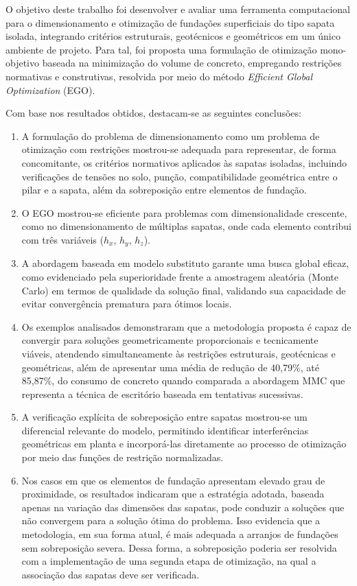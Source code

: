 O objetivo deste trabalho foi desenvolver e avaliar uma ferramenta computacional para o dimensionamento e otimização de fundações superficiais do tipo sapata isolada, integrando critérios estruturais, geotécnicos e geométricos em um único ambiente de projeto. Para tal, foi proposta uma formulação de otimização mono-objetivo baseada na minimização do volume de concreto, empregando restrições normativas e construtivas, resolvida por meio do método \textit{Efficient Global Optimization} (EGO).

Com base nos resultados obtidos, destacam-se as seguintes conclusões:
\begin{enumerate}
    \item A formulação do problema de dimensionamento como um problema de otimização com restrições mostrou-se adequada para representar, de forma concomitante, os  critérios normativos aplicados às sapatas isoladas, incluindo verificações de tensões no solo, punção, compatibilidade geométrica entre o pilar e a sapata, além da sobreposição entre elementos de fundação.
    \item O EGO mostrou-se eficiente para problemas com dimensionalidade crescente, como no dimensionamento de múltiplas sapatas, onde cada elemento contribui com três variáveis ($h_x$, $h_y$, $h_z$).
    \item A abordagem baseada em modelo substituto garante uma busca global eficaz, como evidenciado pela superioridade frente a amostragem aleatória (Monte Carlo) em termos de qualidade da solução final, validando sua capacidade de evitar convergência prematura para ótimos locais.
    \item Os exemplos analisados demonstraram que a metodologia proposta é capaz de convergir para soluções geometricamente proporcionais e tecnicamente viáveis, atendendo simultaneamente às restrições estruturais, geotécnicas e geométricas, além de apresentar uma média de redução de 40,79\%, até 85,87\%, do consumo de concreto quando comparada a abordagem MMC que representa a técnica de escritório baseada em tentativas sucessivas.
    \item A verificação explícita de sobreposição entre sapatas mostrou-se um diferencial relevante do modelo, permitindo identificar interferências geométricas em planta e incorporá-las diretamente ao processo de otimização por meio das funções de restrição normalizadas.
    \item Nos casos em que os elementos de fundação apresentam elevado grau de proximidade, os resultados indicaram que a estratégia adotada, baseada apenas na variação das dimensões das sapatas, pode conduzir a soluções que não convergem para a solução ótima do problema. Isso evidencia que a metodologia, em sua forma atual, é mais adequada a arranjos de fundações sem sobreposição severa. Dessa forma, a sobreposição poderia ser resolvida com a implementação de uma segunda etapa de otimização, na qual a associação das sapatas deve ser verificada.

\end{enumerate}
